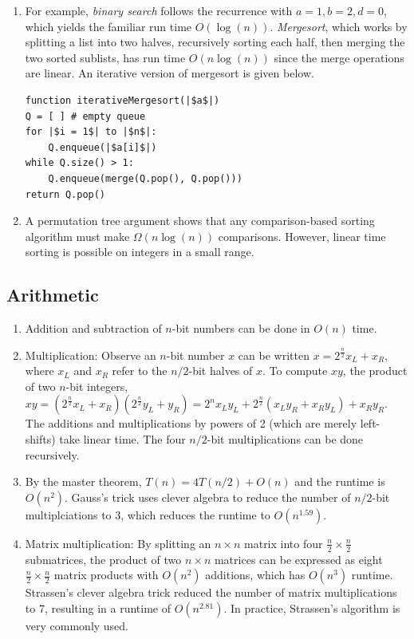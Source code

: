 \documentclass[10pt]{article}
\begin{document}
\begin{multicols}{2}
\begin{addmargin}[0.8em]{0.5em}
\begin{enumerate}[label=(\alph*)]
        \item For example, \textit{binary search} follows the recurrence with $a = 1, b = 2, d = 0$, which yields the familiar run time $O(\log(n))$. \textit{Mergesort}, which works by splitting a list into two halves, recursively sorting each half, then merging the two sorted sublists, has run time $O(n\log(n))$ since the merge operations are linear. An iterative version of mergesort is given below.
        
        \begin{verbatim}
function iterativeMergesort(|$a$|) 
Q = [ ] # empty queue 
for |$i = 1$| to |$n$|:
    Q.enqueue(|$a[i]$|) 
while Q.size() > 1:
    Q.enqueue(merge(Q.pop(), Q.pop()))
return Q.pop()
        \end{verbatim}
        
        \item A permutation tree argument shows that any comparison-based sorting algorithm must make $\Omega(n\log(n))$ comparisons. However, linear time sorting is possible on integers in a small range.
    \end{enumerate}
    
    \subsection{Arithmetic}
    \begin{enumerate}[label=(\alph*)]
        \item Addition and subtraction of $n$-bit numbers can be done in $O(n)$ time.
        \item Multiplication: Observe an $n$-bit number $x$ can be written $x=2^\frac{n}{2}x_L+x_R$, where $x_L$ and $x_R$ refer to the $n/2$-bit halves of $x$. To compute $xy$, the product of two $n$-bit integers, $xy = (2^\frac{n}{2}x_L+x_R)(2^\frac{n}{2}y_L+y_R) = 2^nx_Ly_L + 2^\frac{n}{2} (x_Ly_R + x_Ry_L) + x_Ry_R$. The additions and multiplications by powers of 2 (which are merely left-shifts) take linear time. The four $n/2$-bit multiplications can be done recursively. 
        \item By the master theorem, $T(n) = 4T(n/2)+O(n)$ and the runtime is $O(n^2)$. Gauss’s trick uses clever algebra to reduce the number of $n/2$-bit multiplciations to 3, which reduces the runtime to $O(n^{1.59})$.
        \item Matrix multiplication: By splitting an $n\times n$ matrix into four $\frac{n}{2} \times \frac{n}{2}$ submatrices, the product of two $n\times n$ matrices can be expressed as eight $\frac{n}{2} \times \frac{n}{2}$ matrix products with $O(n^2)$ additions, which has $O(n^3)$ runtime. Strassen's clever algebra trick reduced the number of matrix multiplications to 7, resulting in a runtime of $O(n^{2.81})$. In practice, Strassen's algorithm is very commonly used.
    \end{enumerate}       
    

\end{addmargin}
\end{multicols}
\end{document}
